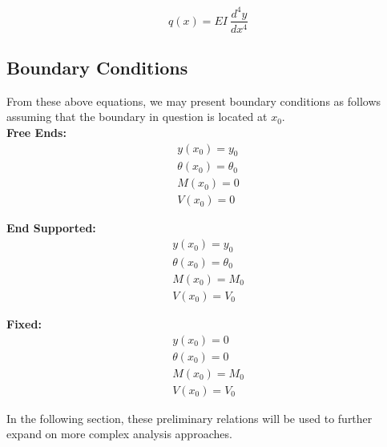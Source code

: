 \begin{equation}
	\label{eq:loadintens}
	q(x) = EI\ \frac{d^4y}{dx^4}
\end{equation}

\subsection{Boundary Conditions}

From these above equations, we may present boundary conditions as follows assuming that the boundary in question is located at $x_0$.\\

\textbf{Free Ends:}\\
\begin{equation}
	\label{eq:freeBC}
	\begin{aligned}
	y(x_0) = y_0 \\
	\theta(x_0)= \theta_0\\
	M(x_0) = 0\\
	V(x_0) = 0 
	\end{aligned}
\end{equation}

\textbf{End Supported:}\\
\begin{equation}
	\label{eq:freeBC}
	\begin{aligned}
	y(x_0)=y_0 \\
	\theta(x_0)=\theta_0\\
	M(x_0)=M_0\\
	V(x_0) =V_0 
	\end{aligned}
\end{equation}

\textbf{Fixed:}\\
\begin{equation}
	\label{eq:freeBC}
	\begin{aligned}
	y(x_0)=0 \\
	\theta(x_0)=0\\
	M(x_0)=M_0\\
	V(x_0) =V_0 
	\end{aligned}
\end{equation}

In the following section, these preliminary relations will be used to further expand on more complex analysis approaches.

